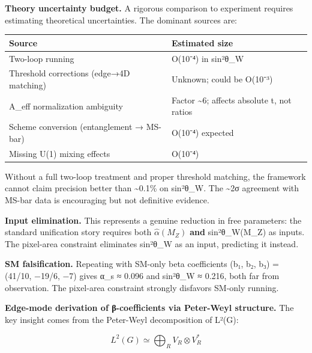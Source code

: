 \documentclass[
]{article}
\newcounter{none} %
\begin{document}
\textbf{Theory uncertainty budget.} A rigorous comparison to experiment
requires estimating theoretical uncertainties. The dominant sources are:

{\def\LTcaptype{none} %
\begin{longtable}[]{@{}
  >{\raggedright\arraybackslash}p{}
  >{\raggedright\arraybackslash}p{}@{}}
\toprule\noalign{}
\begin{minipage}[b]{\linewidth}\raggedright
Source
\end{minipage} & \begin{minipage}[b]{\linewidth}\raggedright
Estimated size
\end{minipage} \\
\midrule\noalign{}
\endhead
\bottomrule\noalign{}
\endlastfoot
Two-loop running & O(10⁻⁴) in sin²θ\_W \\
Threshold corrections (edge→4D matching) & Unknown; could be O(10⁻³) \\
A\_eff normalization ambiguity & Factor \textasciitilde6; affects
absolute t, not ratios \\
Scheme conversion (entanglement → MS-bar) & O(10⁻⁴) expected \\
Missing U(1) mixing effects & O(10⁻⁴) \\
\end{longtable}
}

Without a full two-loop treatment and proper threshold matching, the
framework cannot claim precision better than \textasciitilde0.1\% on
sin²θ\_W. The \textasciitilde2σ agreement with MS-bar data is
encouraging but not definitive evidence.

\textbf{Input elimination.} This represents a genuine reduction in free
parameters: the standard unification story requires both
\(\hat{\alpha}(M_Z)\) \textbf{and} sin²θ\_W(M\_Z) as inputs. The
pixel-area constraint eliminates sin²θ\_W as an input, predicting it
instead.

\textbf{SM falsification.} Repeating with SM-only beta coefficients (b₁,
b₂, b₃) = (41/10, −19/6, −7) gives α\_s ≈ 0.096 and sin²θ\_W ≈ 0.216,
both far from observation. The pixel-area constraint strongly disfavors
SM-only running.

\textbf{Edge-mode derivation of β-coefficients via Peter-Weyl
structure.} The key insight comes from the Peter-Weyl decomposition of
L²(G):

\[
L^2(G) \simeq \bigoplus_R V_R \otimes V_R^*
\]
\end{document}
